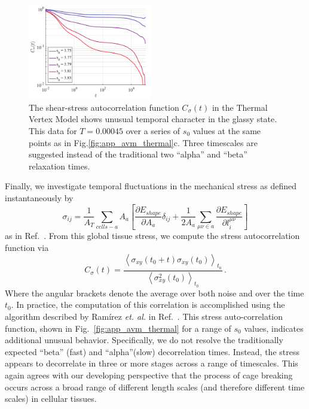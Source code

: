 \documentclass[
reprint
,aps
,amssymb
,amsmath
,superscriptaddress
]{revtex4-1}
\begin{document}
    
\begin{figure}[!t]  
\begin{center}
    \includegraphics[width=0.48\textwidth]{manuscript_images_app_thermal_stresscorr.pdf}
    \caption{\label{fig:app_thermal_stresscorr} The shear-stress autocorrelation function $C_{\sigma}(t)$ in the Thermal Vertex Model shows unusual temporal character in the glassy state. This data for $T=0.00045$ over a series of $s_0$ values at the same points as in Fig.\ref{fig:app_avm_thermal}c. Three timescales are suggested instead of the traditional two ``alpha'' and ``beta'' relaxation times.  }
    \end{center}
  \end{figure}




Finally, we investigate temporal fluctuations in the mechanical stress as defined instantaneously by
%
\begin{equation}\label{eq:mech_stress}
  \sigma_{ij} = \frac{1}{A_T} \sum_{cells-a} A_a \left[ \frac{\partial E_{shape}}{\partial A_a} \delta_{ij} + \frac{1}{2 A_a} \sum_{\mu\nu \in a}\frac{\partial E_{shape}}{\partial l^{\mu\nu}_i} \right]
\end{equation}
%
as in Ref.~\cite{Yang2017}. From this global tissue stress, we compute the stress autocorrelation function via
%
\begin{equation}\label{eq:app_stresscorr}
  C_{\sigma}(t) = \frac{ \left\langle \sigma_{xy}(t_0 + t) \sigma_{xy}(t_0) \right\rangle_{t_0} }{ \left\langle \sigma_{xy}^2(t_0) \right\rangle_{t_0}} \, .
\end{equation}
%
Where the angular brackets denote the average over both noise and over the time $t_0$. In practice, the computation of this correlation is accomplished using the algorithm described by Ram{\'i}rez \textit{et. al.} in Ref.~\cite{Ramirez2010}. This stress auto-correlation function, shown in Fig.~\ref{fig:app_avm_thermal} for a range of $s_0$ values, indicates additional unusual behavior. Specifically, we do not resolve the traditionally expected ``beta'' (fast) and ``alpha''(slow) decorrelation times. Instead, the stress appears to decorrelate in three or more stages across a range of timescales. This again agrees with our developing perspective that the process of cage breaking occurs across a broad range of different length scales (and therefore different time scales) in cellular tissues.
\end{document}
